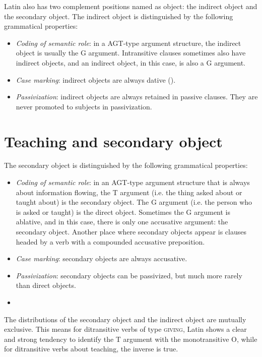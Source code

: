 \documentclass[a4paper, oneside, 12pt]{report}
\newcommand{\classify}[1]{{\textsc{#1}}}
\begin{document}
Latin also has two complement positions named as object:
the indirect object and the secondary object.
The indirect object is distinguished by the following grammatical properties:
\begin{itemize}
    \item \emph{Coding of semantic role}: in a AGT-type argument structure, 
    the indirect object is usually the G argument.
    Intransitive clauses sometimes also have indirect objects, 
    and an indirect object, in this case, is also a G argument.
    \item \emph{Case marking}: indirect objects are always dative
    ().
    \item \emph{Passivization}: indirect objects are always retained in passive clauses. 
    They are never promoted to subjects in passivization.
\end{itemize}

\section{Teaching and secondary object}

The secondary object is distinguished by the following grammatical properties:
\begin{itemize}
    \item \emph{Coding of semantic role}: in an AGT-type argument structure
    that is always about information flowing,
    the T argument (i.e. the thing asked about or taught about) is the secondary object.
    The G argument (i.e. the person who is asked or taught) is the direct object.
    Sometimes the G argument is ablative, and in this case, 
    there is only one accusative argument: the secondary object.
    Another place where secondary objects appear is 
    clauses headed by a verb with a compounded accusative preposition. %
    \item \emph{Case marking}: secondary objects are always accusative.
    \item \emph{Passivization}: secondary objects can be passivized, but much more rarely than direct objects.
    \item %
\end{itemize}

The distributions of the secondary object and the indirect object 
are mutually exclusive.
This means for ditransitive verbs of type \classify{giving}, 
Latin shows a clear and strong tendency to identify the T argument with the monotransitive O,
while for ditransitive verbs about teaching,
the inverse is true.
\end{document}
